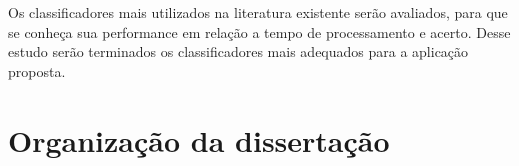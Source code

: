 Os classificadores mais utilizados na literatura existente serão avaliados, para que se conheça sua performance em relação a tempo de processamento e acerto. Desse estudo serão terminados os classificadores mais adequados para a aplicação proposta.

\section{Organização da dissertação}


